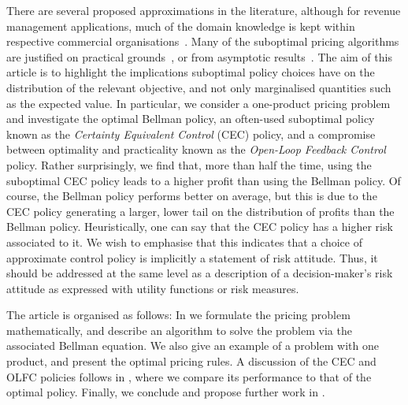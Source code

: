 \documentclass[main.tex]{subfiles}
\begin{document}
There are several proposed approximations in the
literature, although for revenue management applications, much of the domain knowledge is kept within
respective commercial organisations~\cite[Ch.~9]{talluri2006theory}.
Many of the suboptimal pricing algorithms are justified on practical
grounds~\cite{aviv2012dynamic}, or
from asymptotic results~\cite{gallego1994optimal}.
The aim of this article is to highlight the implications suboptimal policy
choices have on the distribution of the relevant objective, and not
only marginalised quantities such as the expected value.
In particular, we consider a one-product pricing problem and
investigate the optimal Bellman policy, an often-used suboptimal
policy known as the \emph{Certainty Equivalent Control} (CEC)
policy, and a compromise between optimality and practicality known as the
\emph{Open-Loop Feedback Control} policy.
Rather surprisingly, we find that, more than half the
time, using the suboptimal CEC policy
leads to a higher profit than using the Bellman policy. Of course, the
Bellman policy performs better on average, but
this is due to the CEC policy generating a larger, lower tail on the
distribution of profits than the Bellman policy.
Heuristically, one can say that the CEC policy has a higher risk
associated to it. We wish to emphasise that this indicates that a
choice of approximate control policy is implicitly a statement of
risk attitude. Thus, it should be addressed at the same level as a
description of a decision-maker's risk attitude as expressed with
utility functions or risk measures.

The article is organised as follows:
In  we formulate the
pricing problem mathematically, and describe an algorithm to solve the
problem via the associated Bellman equation. We also give an example
of a problem with one product, and present the optimal pricing rules.
A discussion of the CEC and OLFC policies follows in
, where we compare its
performance to that of
the optimal policy.
Finally, we conclude and propose further work in .

\biblio
\end{document}
